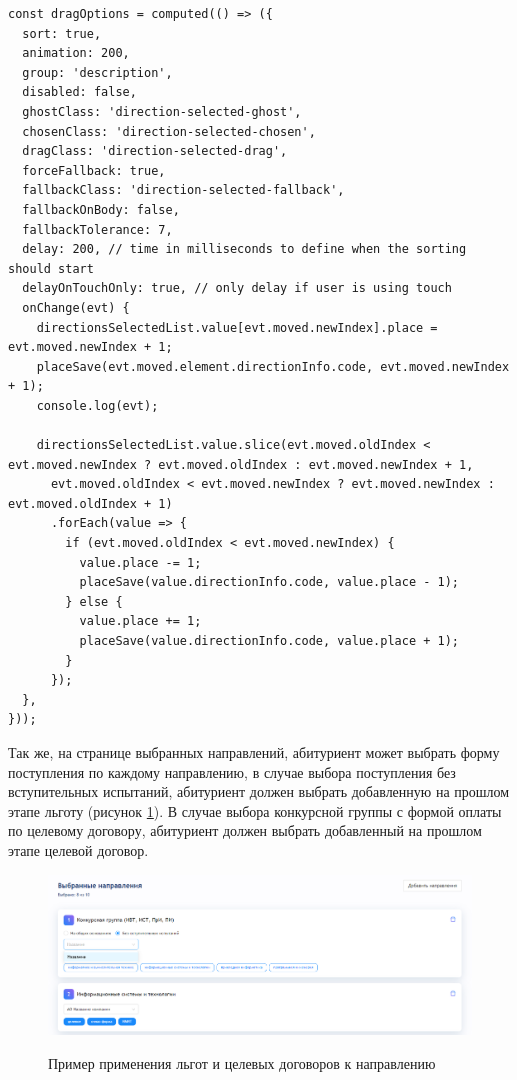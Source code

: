 \begin{lstlisting}[caption={Вычисляемое свойство реализующие изменение приоритета направлений}, label={ls:prioritychange}]
const dragOptions = computed(() => ({
  sort: true,
  animation: 200,
  group: 'description',
  disabled: false,
  ghostClass: 'direction-selected-ghost',
  chosenClass: 'direction-selected-chosen',
  dragClass: 'direction-selected-drag',
  forceFallback: true,
  fallbackClass: 'direction-selected-fallback',
  fallbackOnBody: false,
  fallbackTolerance: 7,
  delay: 200, // time in milliseconds to define when the sorting should start
  delayOnTouchOnly: true, // only delay if user is using touch
  onChange(evt) {
    directionsSelectedList.value[evt.moved.newIndex].place = evt.moved.newIndex + 1;
    placeSave(evt.moved.element.directionInfo.code, evt.moved.newIndex + 1);
    console.log(evt);

    directionsSelectedList.value.slice(evt.moved.oldIndex < evt.moved.newIndex ? evt.moved.oldIndex : evt.moved.newIndex + 1,
      evt.moved.oldIndex < evt.moved.newIndex ? evt.moved.newIndex : evt.moved.oldIndex + 1)
      .forEach(value => {
        if (evt.moved.oldIndex < evt.moved.newIndex) {
          value.place -= 1;
          placeSave(value.directionInfo.code, value.place - 1);
        } else {
          value.place += 1;
          placeSave(value.directionInfo.code, value.place + 1);
        }
      });
  },
}));
\end{lstlisting}

Так же, на странице выбранных направлений, абитуриент может выбрать форму поступления по каждому направлению, в случае выбора поступления без вступительных испытаний, абитуриент должен выбрать добавленную на прошлом этапе льготу (рисунок \ref{fig:choiceprivilegy}). В случае выбора конкурсной группы с формой оплаты по целевому договору, абитуриент должен выбрать добавленный на прошлом этапе целевой договор.

\begin{figure}[H]
\begin{center}
\includegraphics[width=0.9\hsize]{fig/choice-privilegy.png}\\[2mm]
\caption{Пример применения льгот и целевых договоров к направлению}\label{fig:choiceprivilegy}
\end{center}
\end{figure}

